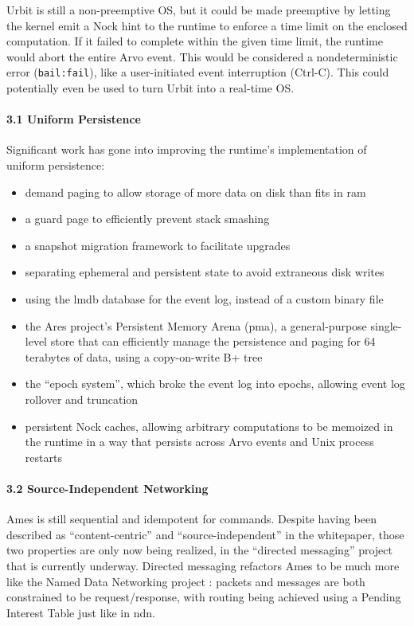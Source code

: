 \documentclass[twoside]{article}
\begin{document}
Urbit is still a non-preemptive OS, but it could be made preemptive by letting the kernel emit a Nock hint to the runtime to enforce a time limit on the enclosed computation.  If it failed to complete within the given time limit, the runtime would abort the entire Arvo event.  This would be considered a nondeterministic error (\lstinline[style=inlinecode]{bail:fail}), like a user-initiated event interruption (Ctrl-C).  This could potentially even be used to turn Urbit into a real-time OS.

\paragraph{3.1 Uniform Persistence}

Significant work has gone into improving the runtime's implementation of uniform persistence:
\begin{itemize}
  \item  demand paging to allow storage of more data on disk than fits in {\sc ram}
  \item  a guard page to efficiently prevent stack smashing
  \item  a snapshot migration framework to facilitate upgrades
  \item  separating ephemeral and persistent state to avoid extraneous disk writes
  \item  using the {\sc lmdb} database for the event log, instead of a custom binary file
  \item  the Ares project's Persistent Memory Arena ({\sc pma}), a general-purpose single-level store that can efficiently manage the persistence and paging for 64 terabytes of data, using a copy-on-write B+ tree
  \item  the ``epoch system'', which broke the event log into epochs, allowing event log rollover and truncation
  \item  persistent Nock caches, allowing arbitrary computations to be memoized in the runtime in a way that persists across Arvo events and Unix process restarts
\end{itemize}

\paragraph{3.2 Source-Independent Networking}

Ames is still sequential and idempotent for commands.  Despite having been described as ``content-centric'' and ``source-independent'' in the whitepaper, those two properties are only now being realized, in the ``directed messaging'' project that is currently underway.  Directed messaging refactors Ames to be much more like the Named Data Networking project \citep{Zhang2014}: packets and messages are both constrained to be request/response, with routing being achieved using a Pending Interest Table just like in {\sc ndn}.
\end{document}
